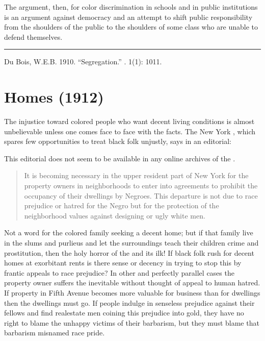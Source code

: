 \documentclass[letterpaper,10pt,english]{jupyterBook}
\begin{document}
\sphinxAtStartPar
The argument, then, for color discrimination in schools and in public institutions is an argument against democracy and an attempt to shift public responsibility from the shoulders of the public to the shoulders of some class who are unable to defend themselves.


\bigskip\hrule\bigskip


\sphinxAtStartPar
{} Du Bois, W.E.B. 1910. “Segregation.” . 1(1): 10\sphinxhyphen{}11.


\section{Homes (1912)}
\label{\detokenize{Volumes/03/05/homes:homes-1912}}\label{\detokenize{Volumes/03/05/homes::doc}}
\sphinxAtStartPar
The injustice toward colored people who want decent living conditions is almost unbelievable unless one comes face to face with the facts. The New York , which spares few opportunities to treat black folk unjustly, says in an editorial:

\begin{sphinxShadowBox}
\sphinxstylesidebartitle{}

\sphinxAtStartPar
This editorial does not seem to be available in any online archives of the .
\end{sphinxShadowBox}
\begin{quote}

\sphinxAtStartPar
It is becoming necessary in the upper resident part of New York for the property owners in neighborhoods to enter into agreements to prohibit the occupancy of their dwellings by Negroes. This departure is not due to race prejudice or hatred for the Negro but for the protection of the neighborhood values against designing or ugly white men.
\end{quote}

\sphinxAtStartPar
Not a word for the colored family seeking a decent home; but if that family live in the slums and purlieus and let the surroundings teach their children crime and prostitution, then the holy horror of the  and its ilk! If black folk rush for decent homes at exorbitant rents is there sense or decency in trying to stop this by frantic appeals to race prejudice? In other and perfectly parallel cases the property owner suffers the inevi­table without thought of appeal to human hatred. If property in Fifth Avenue becomes more valuable for business than for dwellings then the dwellings must go. If people indulge in senseless prejudice against their fellows and find real\sphinxhyphen{}estate men coining this prejudice into gold, they have no right to blame the unhappy victims of their barbarism, but they must blame that barbarism misnamed race pride.
\end{document}
